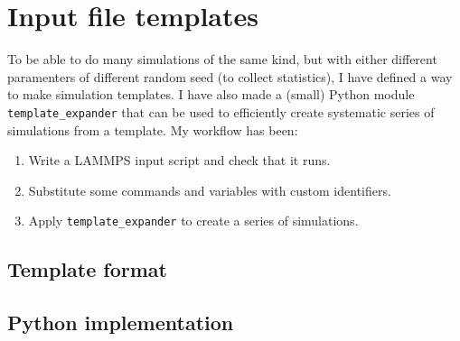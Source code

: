 \chapter{Input file templates}
To be able to do many simulations of the same kind, but with either different paramenters of different random seed (to collect statistics), I have defined a way to make simulation templates. I have also made a (small) Python module {\tt template\_expander} that can be used to efficiently create systematic series of simulations from a template. My workflow has been: 

\begin{enumerate}
\item Write a LAMMPS input script and check that it runs.
\item Substitute some commands and variables with custom identifiers.
\item Apply {\tt template\_expander} to create a series of simulations.
\end{enumerate}

\section{Template format}

\section{Python implementation}
